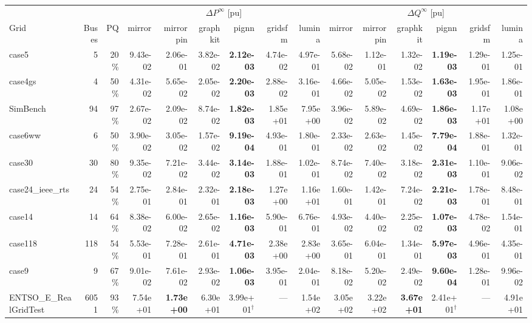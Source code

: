 \documentclass[10pt]{article}
\begin{document}
\begin{landscape}
\begin{table}[H]
\centering\scriptsize
\begin{tabular}{lrr rrrrrr rrrrrr}
\toprule
 & & & \multicolumn{6}{c}{$\Delta P^{\infty}$ [pu]} & \multicolumn{6}{c}{$\Delta Q^{\infty}$ [pu]} \\
\cmidrule(lr){4-9}\cmidrule(lr){10-15}
Grid & Buses & PQ & mirror & mirrorpin & graphkit & pignn & gridsfm & lumina & mirror & mirrorpin & graphkit & pignn & gridsfm & lumina \\
\midrule
case5 & 5 & 20\% & 9.43e-02 & 2.06e-01 & 3.82e-02 & \textbf{2.12e-03} & 4.74e-02 & 4.97e-01 & 5.68e-02 & 1.12e-01 & 1.32e-02 & \textbf{1.19e-03} & 1.29e-01 & 1.25e-01 \\
case4gs & 4 & 50\% & 4.31e-02 & 5.65e-02 & 2.05e-02 & \textbf{2.20e-03} & 2.88e-02 & 3.16e-01 & 4.66e-02 & 5.05e-02 & 1.53e-02 & \textbf{1.63e-03} & 1.95e-01 & 1.86e-01 \\
SimBench & 94 & 97\% & 2.67e-02 & 2.09e-02 & 8.74e-02 & \textbf{1.82e-03} & 1.85e+01 & 7.95e+00 & 3.96e-02 & 5.89e-02 & 4.69e-02 & \textbf{1.86e-03} & 1.17e+01 & 1.08e+00 \\
case6ww & 6 & 50\% & 3.90e-02 & 3.05e-02 & 1.57e-02 & \textbf{9.19e-04} & 4.93e-01 & 1.80e-01 & 2.33e-02 & 2.63e-02 & 1.45e-02 & \textbf{7.79e-04} & 1.88e-01 & 1.32e-01 \\
case30 & 30 & 80\% & 9.35e-02 & 7.21e-02 & 3.44e-02 & \textbf{3.14e-03} & 1.88e-01 & 1.02e-01 & 8.74e-02 & 7.40e-02 & 3.18e-02 & \textbf{2.31e-03} & 1.10e-01 & 9.06e-02 \\
case24\_ieee\_rts & 24 & 54\% & 2.75e-01 & 2.84e-01 & 2.32e-01 & \textbf{2.18e-03} & 1.27e+00 & 1.16e+01 & 1.60e-01 & 1.42e-01 & 7.24e-02 & \textbf{2.21e-03} & 1.78e-01 & 8.48e-01 \\
case14 & 14 & 64\% & 8.38e-02 & 6.00e-02 & 2.65e-02 & \textbf{1.16e-03} & 5.90e-01 & 6.76e-01 & 4.93e-02 & 4.40e-02 & 2.25e-02 & \textbf{1.07e-03} & 4.78e-02 & 1.54e-01 \\
case118 & 118 & 54\% & 5.53e-01 & 7.28e-01 & 2.61e-01 & \textbf{4.71e-03} & 2.38e+00 & 2.83e+00 & 3.65e-01 & 6.04e-01 & 1.34e-01 & \textbf{5.97e-03} & 4.96e-01 & 4.35e-01 \\
case9 & 9 & 67\% & 9.01e-02 & 7.61e-02 & 2.93e-02 & \textbf{1.06e-03} & 3.95e-01 & 2.04e-01 & 8.18e-02 & 5.20e-02 & 2.49e-02 & \textbf{9.60e-04} & 1.28e-01 & 9.96e-02 \\
ENTSO\_E\_RealGridTest & 6051 & 93\% & 7.54e+01 & \textbf{1.73e+00} & 6.30e+01 & 3.99e+01$^\dagger$ & --- & 1.54e+02 & 3.05e+02 & 3.22e+02 & \textbf{3.67e+01} & 2.41e+01$^\dagger$ & --- & 4.91e+01 \\

\end{tabular}
\end{table}
\end{landscape}
\end{document}
